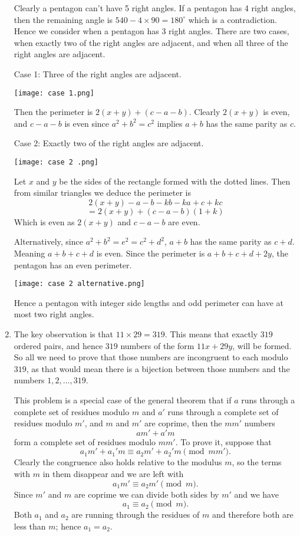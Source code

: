 \documentclass[a4paper]{article}
\begin{document}
\begin{enumerate}
		Clearly a pentagon can't have 5 right angles. If a pentagon has 4 right angles, then the remaining angle is $540-4\times 90=180^{\circ}$ which is a contradiction. Hence we consider when a pentagon has 3 right angles.
There are two cases, when exactly two of the right angles are adjacent, and when all three of the right angles are adjacent. 

		Case 1: Three of the right angles are adjacent. 

\centerline{\texttt{[image: case 1.png]}}

		Then the perimeter is $2(x+y)+(c-a-b)$. Clearly $2(x+y)$ is even, and $c-a-b$ is even since $a^2+b^2=c^2$ implies $a+b$ has the same parity as $c$. 

Case 2: Exactly two of the right angles are adjacent. \\ \centerline{\texttt{[image: case 2 .png]}}
Let $x$ and $y$ be the sides of the rectangle formed with the dotted lines. Then from similar triangles we deduce the perimeter is $$2(x+y)-a-b-kb-ka+c+kc$$ $$= 2(x+y)+(c-a-b)(1+k)$$ Which is even as $2(x+y)$ and $c-a-b$ are even. 

		Alternatively, since $a^2+b^2=e^2=c^2+d^2$, $a+b$ has the same parity as $c+d$. Meaning $a+b+c+d$ is even. Since the perimeter is $a+b+c+d+2y$, the pentagon has an even perimeter. 


		{\centerline{\texttt{[image: case 2 alternative.png]}}}

 Hence a pentagon with integer side lengths and odd perimeter can have at most two right angles.
\item The key observation is that \(11\times29=319\). This means that exactly
	\(319\) ordered pairs, and hence \(319\) numbers
		of the form \(11x+29y\), will be formed. 
		So all we need to prove that those numbers are incongruent
		to each modulo \(319\), as that would mean there is
		a bijection between those numbers
		and the numbers \(1,2,\ldots,319.\)

		This problem is a special case of the general theorem
		that if \(a\) runs through a complete set of residues
		modulo \(m\) and \(a'\) runs through a complete set of
		residues modulo \(m'\), and \(m\) and \(m'\) are coprime,
		then the \(mm'\) numbers
		\[am'+a'm\] form a complete set of residues modulo \(mm'\).
		To prove it, suppose that
		\begin{equation}\label{eq:congr}
			a_1m'+a_1'm\equiv a_2m'+a_2'm\pmod{mm'}.
		\end{equation}
		Clearly the congruence also holds relative to the modulus
		\(m\), so the terms with \(m\) in them disappear and
		we are left with
		\[a_1m'\equiv a_2m'\pmod{m}.\]
		Since \(m'\) and \(m\) are coprime we can divide both sides
		by \(m'\) and we have \[a_1\equiv a_2\pmod{m}.\]
		Both \(a_1\) and \(a_2\) are running through the residues
		of \(m\) and therefore both are less than \(m\); hence
		\(a_1=a_2\).


\end{enumerate}
\end{document}
